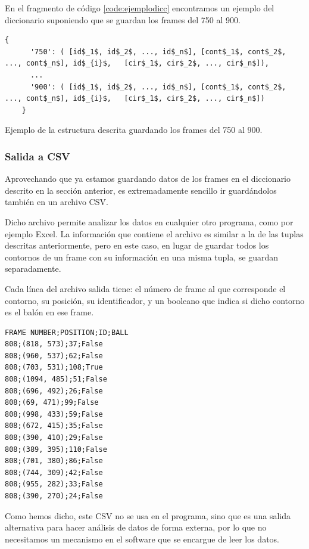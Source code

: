 En el fragmento de código \ref{code:ejemplodicc} encontramos un ejemplo del diccionario suponiendo que se guardan los frames del 750 al 900. 

\begin{lstfloat}
  \begin{lstlisting}[mathescape]
    {
      '750': ( [id$_1$, id$_2$, ..., id$_n$], [cont$_1$, cont$_2$, ..., cont$_n$], id$_{i}$,   [cir$_1$, cir$_2$, ..., cir$_n$]),
      ...
      '900': ( [id$_1$, id$_2$, ..., id$_n$], [cont$_1$, cont$_2$, ..., cont$_n$], id$_{i}$,   [cir$_1$, cir$_2$, ..., cir$_n$])
    }
  \end{lstlisting}
  \caption{ Ejemplo de la estructura descrita guardando los frames del 750 al 900.}
  \label{code:ejemplodicc}
\end{lstfloat}


\subsubsection*{Salida a CSV}

Aprovechando que ya estamos guardando datos de los frames en el diccionario descrito en la sección anterior, es extremadamente sencillo ir guardándolos también en un archivo CSV.

Dicho archivo permite analizar los datos en cualquier otro programa, como por ejemplo Excel. La información que contiene el archivo es similar a la de las tuplas descritas anteriormente, pero en este caso, en lugar de guardar todos los contornos de un frame con su información en una misma tupla, se guardan separadamente.

Cada línea del archivo salida tiene: el número de frame al que corresponde el contorno, su posición, su identificador, y un booleano que indica si dicho contorno es el balón en ese frame.
\begin{lstlisting}
FRAME NUMBER;POSITION;ID;BALL
808;(818, 573);37;False
808;(960, 537);62;False
808;(703, 531);108;True
808;(1094, 485);51;False
808;(696, 492);26;False
808;(69, 471);99;False
808;(998, 433);59;False
808;(672, 415);35;False
808;(390, 410);29;False
808;(389, 395);110;False
808;(701, 380);86;False
808;(744, 309);42;False
808;(955, 282);33;False
808;(390, 270);24;False
\end{lstlisting}

Como hemos dicho, este CSV no se usa en el programa, sino que es una salida alternativa para hacer análisis de datos de forma externa, por lo que no necesitamos un mecanismo en el software que se encargue de leer los datos.

